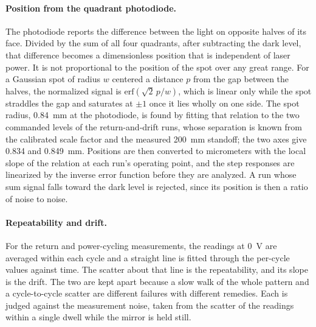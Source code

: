 \documentclass{article}
\begin{document}
\paragraph{Position from the quadrant photodiode.}
The photodiode reports the difference between the light on opposite halves of its face. Divided by
the sum of all four quadrants, after subtracting the dark level, that difference becomes a
dimensionless position that is independent of laser power. It is not proportional to the position
of the spot over any great range. For a Gaussian spot of radius $w$ centered a distance $p$ from the
gap between the halves, the normalized signal is $\mathrm{erf}(\sqrt{2}\,p/w)$, which is linear only
while the spot straddles the gap and saturates at $\pm1$ once it lies wholly on one side. The spot
radius, 0.84~mm at the photodiode, is found by fitting that relation to the two commanded levels of
the return-and-drift runs, whose separation is known from the calibrated scale factor and the measured
200~mm standoff; the two axes give 0.834 and 0.849~mm. Positions are then converted to micrometers
with the local slope of the relation at each run's operating point, and the step responses are
linearized by the inverse error function before they are analyzed. A run whose sum signal falls
toward the dark level is rejected, since its position is then a ratio of noise to noise.

\paragraph{Repeatability and drift.}
For the return and power-cycling measurements, the readings at 0~V are averaged within each cycle and
a straight line is fitted through the per-cycle values against time. The scatter about that line is
the repeatability, and its slope is the drift. The two are kept apart because a slow walk of the
whole pattern and a cycle-to-cycle scatter are different failures with different remedies. Each is
judged against the measurement noise, taken from the scatter of the readings within a single dwell
while the mirror is held still.
\end{document}
